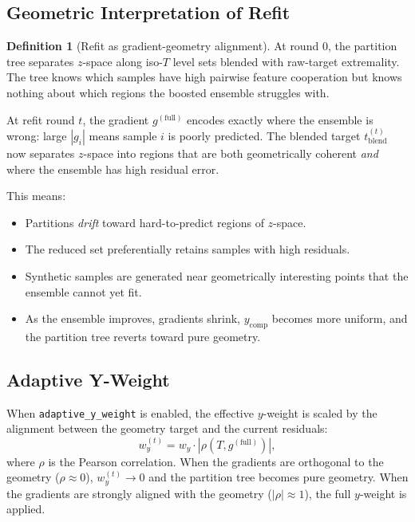\documentclass[11pt,a4paper]{article}
\theoremstyle{definition}
\newtheorem{definition}{Definition}
\begin{document}
\subsection{Geometric Interpretation of Refit}

\begin{definition}[Refit as gradient-geometry alignment]
At round 0, the partition tree separates $z$-space along iso-$T$ level sets
blended with raw-target extremality.  The tree knows which samples have high
pairwise feature cooperation but knows nothing about which regions the
boosted ensemble struggles with.

At refit round $t$, the gradient $g^{(\text{full})}$ encodes exactly where
the ensemble is wrong: large $|g_i|$ means sample $i$ is poorly predicted.
The blended target $t_{\text{blend}}^{(t)}$ now separates $z$-space into
regions that are both geometrically coherent \emph{and} where the ensemble
has high residual error.

This means:
\begin{itemize}[nosep]
    \item Partitions \emph{drift} toward hard-to-predict regions of $z$-space.
    \item The reduced set preferentially retains samples with high residuals.
    \item Synthetic samples are generated near geometrically interesting points
        that the ensemble cannot yet fit.
    \item As the ensemble improves, gradients shrink, $y_{\text{comp}}$ becomes
        more uniform, and the partition tree reverts toward pure geometry.
\end{itemize}
\end{definition}

\subsection{Adaptive Y-Weight}
\label{sec:adaptive_yw}

When \texttt{adaptive\_y\_weight} is enabled, the effective $y$-weight
is scaled by the alignment between the geometry target and the current
residuals:
\begin{equation}
    w_y^{(t)} = w_y \cdot |\rho(T, g^{(\text{full})})|,
\end{equation}
where $\rho$ is the Pearson correlation.  When the gradients are orthogonal
to the geometry ($\rho \approx 0$), $w_y^{(t)} \to 0$ and the partition
tree becomes pure geometry.  When the gradients are strongly aligned with
the geometry ($|\rho| \approx 1$), the full $y$-weight is applied.
\end{document}
